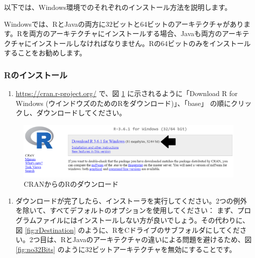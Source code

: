 \documentclass[
  11pt]{book}
\makeatletter
\providecommand{\tightlist}{%
  \setlength{\itemsep}{0pt}\setlength{\parskip}{0pt}}
\newenvironment{kframe}{%
\medskip{}
\setlength{\fboxsep}{.8em}
 \def\at@end@of@kframe{}%
 \ifinner\ifhmode%
  \def\at@end@of@kframe{\end{minipage}}%
  \begin{minipage}{\columnwidth}%
 \fi\fi%
 \def\FrameCommand##1{\hskip\@totalleftmargin \hskip-\fboxsep
 \colorbox{myShadeColor}{##1}\hskip-\fboxsep
     \hskip-\linewidth \hskip-\@totalleftmargin \hskip\columnwidth}%
 \MakeFramed {\advance\hsize-\width
   \@totalleftmargin\z@ \linewidth\hsize
   \@setminipage}}%
 {\par\unskip\endMakeFramed%
 \at@end@of@kframe}
\newenvironment{rmdblock}[1]
  {
  \begin{itemize}
  \renewcommand{\labelitemi}{
    \raisebox{-.7\height}[0pt][0pt]{
      {\setkeys{Gin}{width=3em,keepaspectratio}\texttt{[image: images/\#1]}}
    }
  }
  \setlength{\fboxsep}{1em}
  \begin{kframe}
  \item
  }
  {
  \end{kframe}
  \end{itemize}
  }
\newenvironment{rmdimportant}
  {\begin{rmdblock}{important}}
  {\end{rmdblock}}
\theoremstyle{definition}
\theoremstyle{definition}
\theoremstyle{definition}
\theoremstyle{definition}
\theoremstyle{remark}
\makeatother
\begin{document}
以下では、Windows環境でのそれぞれのインストール方法を説明します。

\begin{rmdimportant}
Windowsでは、RとJavaの両方に32ビットと64ビットのアーキテクチャがあります。Rを両方のアーキテクチャにインストールする場合、Javaも両方のアーキテクチャにインストールしなければなりません。Rの64ビットのみをインストールすることをお勧めします。
\end{rmdimportant}

\subsubsection*{Rのインストール}\label{rux306eux30a4ux30f3ux30b9ux30c8ux30fcux30eb}

\begin{enumerate}
\def\labelenumi{\arabic{enumi}.}
\tightlist
\item
  \url{https://cran.r-project.org/} で、図 \ref{fig:downloadR} に示されるように「Download R for Windows (ウインドウズのためのRをダウンロード)」、「base」 の順にクリックし、ダウンロードしてください。
\end{enumerate}

\begin{figure}

{\centering \includegraphics[width=1\linewidth]{images/OhdsiAnalyticsTools/downloadR} 

}

\caption{CRANからのRのダウンロード}\label{fig:downloadR}
\end{figure}

\begin{enumerate}
\def\labelenumi{\arabic{enumi}.}
\setcounter{enumi}{1}
\tightlist
\item
  ダウンロードが完了したら、インストーラを実行してください。2つの例外を除いて、すべてデフォルトのオプションを使用してください： まず、プログラムファイルにはインストールしない方が良いでしょう。その代わりに、図 \ref{fig:rDestination} のように、RをCドライブのサブフォルダにしてください。2つ目は、RとJavaのアーキテクチャの違いによる問題を避けるため、図 \ref{fig:no32Bits} のように32ビットアーキテクチャを無効にすることです。
\end{enumerate}
\end{document}
